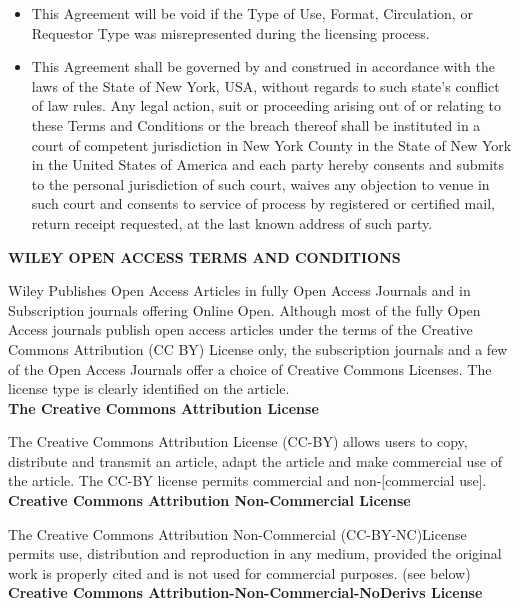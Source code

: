 \begin{itemize}
\item This Agreement will be void if the Type of Use, Format, Circulation, or Requestor Type was misrepresented during the licensing process.

\item This Agreement shall be governed by and construed in accordance with the laws of the State of New York, USA, without regards to such state's conflict of law rules. Any legal action, suit or proceeding arising out of or relating to these Terms and Conditions or the breach thereof shall be instituted in a court of competent jurisdiction in New York County in the State of New York in the United States of America and each party hereby consents and submits to the personal jurisdiction of such court, waives any objection to venue in such court and consents to service of process by registered or certified mail, return receipt requested, at the last known address of such party.\\

\end{itemize}

\noindent \textbf{WILEY OPEN ACCESS TERMS AND CONDITIONS}

Wiley Publishes Open Access Articles in fully Open Access Journals and in Subscription journals offering Online Open. Although most of the fully Open Access journals publish open access articles under the terms of the Creative Commons Attribution (CC BY) License only, the subscription journals and a few of the Open Access Journals offer a choice of Creative Commons Licenses. The license type is clearly identified on the article.\\

\noindent \textbf{The Creative Commons Attribution License}

The Creative Commons Attribution License (CC-BY) allows users to copy, distribute and transmit an article, adapt the article and make commercial use of the article. The CC-BY license permits commercial and non-[commercial use].\\

\noindent \textbf{Creative Commons Attribution Non-Commercial License}

The Creative Commons Attribution Non-Commercial (CC-BY-NC)License permits use, distribution and reproduction in any medium, provided the original work is properly cited and is not used for commercial purposes. (see below)\\

\noindent \textbf{Creative Commons Attribution-Non-Commercial-NoDerivs License}

